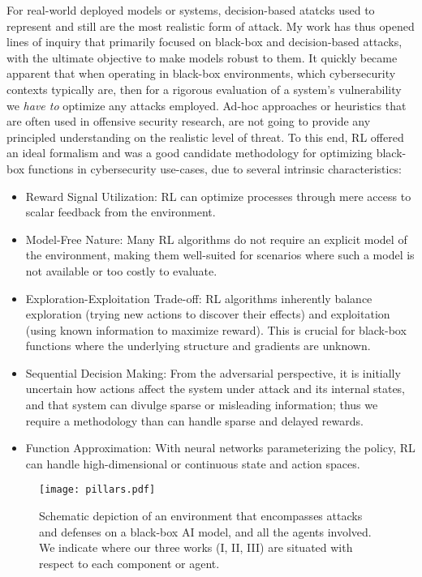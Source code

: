 For real-world deployed models or systems, decision-based atatcks used to represent and still are the most realistic form of attack.
My work has thus opened lines of inquiry that primarily focused on black-box and decision-based attacks, with the ultimate objective to make models robust to them.
It quickly became apparent that when operating in black-box environments, which cybersecurity contexts typically are, then for a rigorous evaluation of a system's vulnerability we \textit{have to} optimize any attacks employed.
Ad-hoc approaches or heuristics that are often used in offensive security research, are not going to provide any principled understanding on the realistic level of threat.
To this end, \gls{RL} offered an ideal formalism and was a good candidate methodology for optimizing black-box functions in cybersecurity use-cases, due to several intrinsic characteristics:

\begin{itemize}
    \item Reward Signal Utilization: RL can optimize processes through mere access to scalar feedback from the environment.
    \item Model-Free Nature: Many RL algorithms do not require an explicit model of the environment, making them well-suited for scenarios where such a model is not available or too costly to evaluate.
    \item Exploration-Exploitation Trade-off: RL algorithms inherently balance exploration (trying new actions to discover their effects) and exploitation (using known information to maximize reward). This is crucial for black-box functions where the underlying structure and gradients are unknown.
    \item Sequential Decision Making: From the adversarial perspective, it is initially uncertain how actions affect the system under attack and its internal states, and that system can divulge sparse or misleading information; thus we require a methodology than can handle sparse and delayed rewards.
    \item Function Approximation: With neural networks parameterizing the policy, RL can handle high-dimensional or continuous state and action spaces.
\end{itemize}


\begin{figure}
    \centering
    \texttt{[image: pillars.pdf]}
    \caption{Schematic depiction of an environment that encompasses attacks and defenses on a black-box AI model, and all the agents involved. We indicate where our three works (I, II, III) are situated with respect to each component or agent.}
    \label{fig:pillars}
\end{figure}

